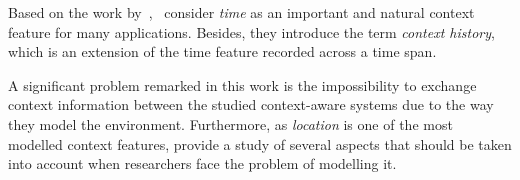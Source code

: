 Based on the work by~\citet{schilit_context_aware_1994},~\citet{chen_survey_2000}
consider \textit{time} as an important and natural context feature for many 
applications. Besides, they introduce the term \textit{context history}, which 
is an extension of the time feature recorded across a time span.

A significant problem remarked in this work is the impossibility to exchange
context information between the studied context-aware systems due to the way
they model the environment. Furthermore, as \textit{location} is one of the most 
modelled context features, \citeauthor{chen_survey_2000} provide a study of 
several aspects that should be taken into account when researchers face the 
problem of modelling it. 




